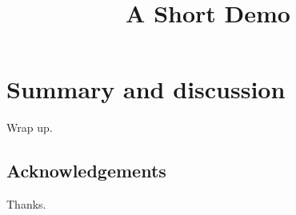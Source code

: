 \documentclass[article]{jss}
\title{A Short Demo}
\begin{document}
\section{Summary and discussion}
Wrap up.
\subsection{Acknowledgements}
Thanks.
\end{document}
